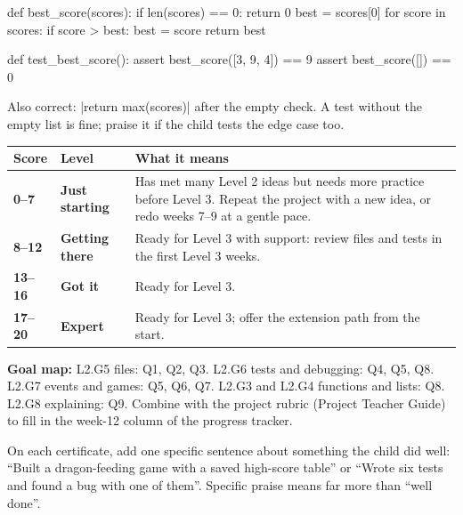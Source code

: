 \begin{answer}
\begin{pycode}
def best_score(scores):
    if len(scores) == 0:
        return 0
    best = scores[0]
    for score in scores:
        if score > best:
            best = score
    return best

def test_best_score():
    assert best_score([3, 9, 4]) == 9
    assert best_score([]) == 0
\end{pycode}
Also correct: \py|return max(scores)| after the empty check. A test without the empty list is
fine; praise it if the child tests the edge case too.
\end{answer}

\begin{rubric}
\renewcommand{\arraystretch}{1.3}
\begin{tabularx}{\linewidth}{@{}>{\bfseries}p{1.6cm}>{\bfseries}p{2.4cm}X@{}}
\toprule
Score & Level & What it means \\ \midrule
0--7 & Just starting & Has met many Level 2 ideas but needs more practice before Level 3. Repeat the project with a new idea, or redo weeks 7--9 at a gentle pace. \\
8--12 & Getting there & Ready for Level 3 with support: review files and tests in the first Level 3 weeks. \\
13--16 & Got it & Ready for Level 3. \\
17--20 & Expert & Ready for Level 3; offer the extension path from the start. \\
\bottomrule
\end{tabularx}
\end{rubric}

\textbf{Goal map:} L2.G5 files: Q1, Q2, Q3. L2.G6 tests and debugging: Q4, Q5, Q8. L2.G7
events and games: Q5, Q6, Q7. L2.G3 and L2.G4 functions and lists: Q8. L2.G8 explaining: Q9.
Combine with the project rubric (Project Teacher Guide) to fill in the week-12 column of the
progress tracker.

\begin{tip}
On each certificate, add one specific sentence about something the child did well: \enquote{Built
a dragon-feeding game with a saved high-score table} or \enquote{Wrote six tests and found a bug with
one of them}. Specific praise means far more than \enquote{well done}.
\end{tip}
